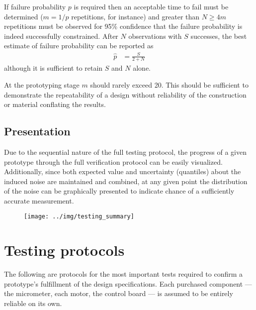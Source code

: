 \documentclass{article}
\begin{document}
If failure probability $p$ is required then an acceptable time to fail must be determined ($m = 1/p$ repetitions, for instance) and greater than $N \ge 4m$ repetitions must be observed for 95\% confidence that the failure probability is indeed successfully constrained. After $N$ observations with $S$ successes, the best estimate of failure probability can be reported as
\begin{align}
  \hat{p} &= \frac{S}{2 + N}
\end{align}
although it is sufficient to retain $S$ and $N$ alone.

At the prototyping stage $m$ should rarely exceed 20. This should be sufficient to demonstrate the repeatability of a design without reliability of the construction or material conflating the results.

\subsection{Presentation}
\label{sec:presentation}

Due to the sequential nature of the full testing protocol, the progress of a given prototype through the full verification protocol can be easily visualized. Additionally, since both expected value and uncertainty (quantiles) about the induced noise are maintained and combined, at any given point the distribution of the noise can be graphically presented to indicate chance of a sufficiently accurate measurement.

\begin{figure}[H]
  \centering
  \texttt{[image: ../img/testing\_summary]}
  \label{fig:summary}
\end{figure}

\section{Testing protocols}
\label{sec:protocols}

The following are protocols for the most important tests required to confirm a prototype's fulfillment of the design specifications. Each purchased component --- the micrometer, each motor, the control board --- is assumed to be entirely reliable on its own. 
\end{document}
